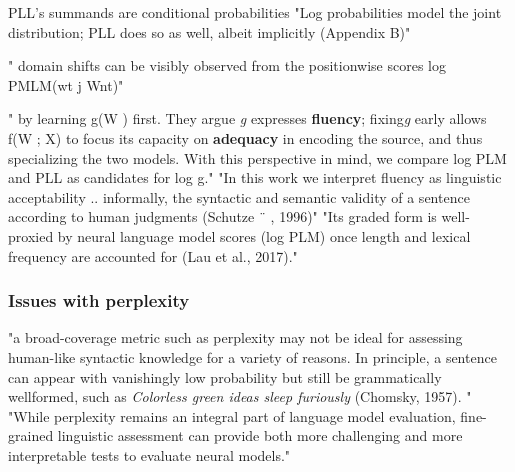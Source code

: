 PLL’s summands  are conditional probabilities   \citep{salazar2020masked}
"Log probabilities model the joint distribution; PLL does so as well, albeit implicitly (Appendix B)"  \citep{salazar2020masked}

" domain shifts can be visibly observed from the positionwise scores log PMLM(wt j Wnt)" \citep{salazar2020masked}

" by learning g(W ) first. They argue \textit{g} expresses \textbf{fluency}; fixing\textit{g} early allows f(W ; X) to focus its capacity on \textbf{adequacy} in encoding the source, and thus specializing the two models. With this perspective in mind, we compare log PLM and PLL as candidates for log g."  \citep{salazar2020masked}
"In this work we interpret fluency as linguistic acceptability ..  informally, the syntactic and semantic validity of a sentence according to human judgments (Schutze ¨ , 1996)" \citep{salazar2020masked} "Its graded form is well-proxied by neural language model scores (log PLM) once length and lexical frequency
are accounted for (Lau et al., 2017)."  \citep{salazar2020masked}


\subsubsection{Issues with perplexity}






"a broad-coverage metric such as perplexity may not be ideal for assessing human-like syntactic knowledge for a variety of reasons. In principle, a sentence can appear with vanishingly low probability but still be grammatically wellformed, such as \textit{Colorless green ideas sleep furiously} (Chomsky, 1957).  "  \citep{hu2020systematic}
"While perplexity remains an integral part of language model evaluation, fine-grained linguistic assessment can provide both more challenging and more interpretable tests to evaluate neural models."  \citep{hu2020systematic}


